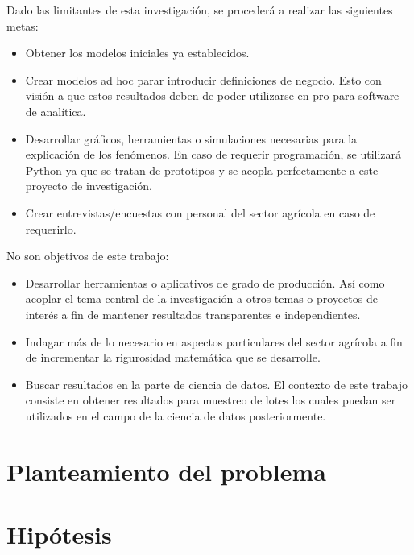 \documentclass{report}
\begin{document}
Dado las limitantes de esta investigación, se procederá a realizar las siguientes metas:

\begin{itemize}
    \item Obtener los modelos iniciales ya establecidos.
    
    \item Crear modelos ad hoc parar introducir definiciones de negocio. Esto con visión a que estos resultados deben de poder utilizarse en pro para software de analítica.
    
    \item Desarrollar gráficos, herramientas o simulaciones necesarias para la explicación de los fenómenos. En caso de requerir programación, se utilizará Python ya que se tratan de prototipos y se acopla perfectamente a este proyecto de investigación.
    
    \item Crear entrevistas/encuestas con personal del sector agrícola en caso de requerirlo.
\end{itemize}

\bigbreak

No son objetivos de este trabajo:

\begin{itemize}
    \item Desarrollar herramientas o aplicativos de grado de producción. Así como acoplar el tema central de la investigación a otros temas o proyectos de interés a fin de mantener resultados transparentes e independientes.
    
    \item Indagar más de lo necesario en aspectos particulares del sector agrícola a fin de incrementar la rigurosidad matemática que se desarrolle.
    
    \item Buscar resultados en la parte de ciencia de datos. El contexto de este trabajo consiste en obtener resultados para muestreo de lotes los cuales puedan ser utilizados en el campo de la ciencia de datos posteriormente.
\end{itemize}

\section{Planteamiento del problema}


\section{Hipótesis}
\end{document}
